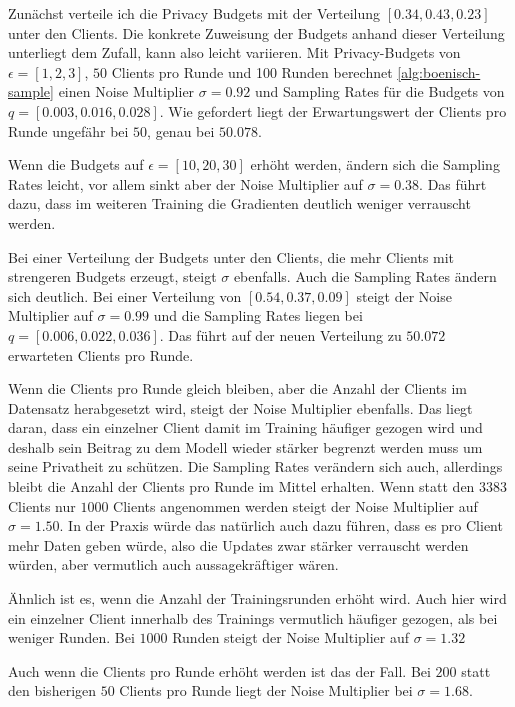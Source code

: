 Zunächst verteile ich die Privacy Budgets mit der Verteilung $[0.34, 0.43, 0.23]$ unter den Clients. Die konkrete Zuweisung der Budgets anhand dieser Verteilung unterliegt dem Zufall, kann also leicht variieren. Mit Privacy-Budgets von $\epsilon = [1,2,3]$, $50$ Clients pro Runde und 100 Runden berechnet \autoref{alg:boenisch-sample} einen Noise Multiplier $\sigma = 0.92$ und Sampling Rates für die Budgets von $q = [0.003, 0.016, 0.028]$. Wie gefordert liegt der Erwartungswert der Clients pro Runde ungefähr bei $50$, genau bei $50.078$.

Wenn die Budgets auf $\epsilon = [10, 20, 30]$ erhöht werden, ändern sich die Sampling Rates leicht, vor allem sinkt aber der Noise Multiplier auf $\sigma = 0.38$. Das führt dazu, dass im weiteren Training die Gradienten deutlich weniger verrauscht werden.

Bei einer Verteilung der Budgets unter den Clients, die mehr Clients mit strengeren Budgets erzeugt, steigt $\sigma$ ebenfalls. Auch die Sampling Rates ändern sich deutlich. Bei einer Verteilung von $[0.54, 0.37, 0.09]$ steigt der Noise Multiplier auf $\sigma = 0.99$ und die Sampling Rates liegen bei $q = [0.006, 0.022, 0.036]$. Das führt auf der neuen Verteilung zu $50.072$ erwarteten Clients pro Runde.

Wenn die Clients pro Runde gleich bleiben, aber die Anzahl der Clients im Datensatz herabgesetzt wird, steigt der Noise Multiplier ebenfalls. Das liegt daran, dass ein einzelner Client damit im Training häufiger gezogen wird und deshalb sein Beitrag zu dem Modell wieder stärker begrenzt werden muss um seine Privatheit zu schützen. Die Sampling Rates verändern sich auch, allerdings bleibt die Anzahl der Clients pro Runde im Mittel erhalten. Wenn statt den $3383$ Clients nur $1000$ Clients angenommen werden steigt der Noise Multiplier auf $\sigma = 1.50$. In der Praxis würde das natürlich auch dazu führen, dass es pro Client mehr Daten geben würde, also die Updates zwar stärker verrauscht werden würden, aber vermutlich auch aussagekräftiger wären.

Ähnlich ist es, wenn die Anzahl der Trainingsrunden erhöht wird. Auch hier wird ein einzelner Client innerhalb des Trainings vermutlich häufiger gezogen, als bei weniger Runden. Bei $1000$ Runden steigt der Noise Multiplier auf $\sigma = 1.32$

Auch wenn die Clients pro Runde erhöht werden ist das der Fall. Bei $200$ statt den bisherigen $50$ Clients pro Runde liegt der Noise Multiplier bei $\sigma = 1.68$.




